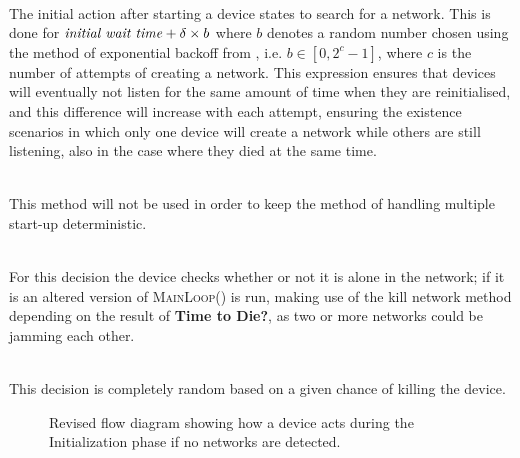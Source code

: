 \begin{description}[labelindent=\parindent]
    \item[Search for network]\hfill\\
    The initial action after starting a device states to search for a network.
    This is done for $\text{\textit{initial wait time}} + \delta \times b$ where $b$ denotes a random number chosen using the method of exponential backoff from , i.e. $b \in [0, 2^c-1]$, where $c$ is the number of attempts of creating a network.
    This expression ensures that devices will eventually not listen for the same amount of time when they are reinitialised, and this difference will increase with each attempt, ensuring the existence scenarios in which only one device will create a network while others are still listening, also in the case where they died at the same time.
    \item[Chance of creating a network]\hfill\\
    This method will not be used in order to keep the method of handling multiple start-up deterministic.
    \item[Alone in network?]\hfill\\
    For this decision the device checks whether or not it is alone in the network; if it is an altered version of \textsc{MainLoop()} is run, making use of the kill network method depending on the result of \textbf{Time to Die?}, as two or more networks could be jamming each other.
    \item[Time to Die?]\hfill\\
    This decision is completely random based on a given chance of killing the device.
\end{description}

\begin{figure}[p]
\centering
\footnotesize

\vspace{-15pt}
\caption{Revised flow diagram showing how a device acts during the Initialization phase if no networks are detected.}
\label{fig:pseudo_flowMultiStart}
\vspace{-10pt}    
\end{figure}

